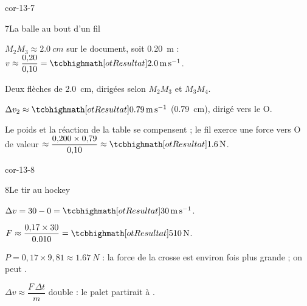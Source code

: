 \begin{blocLivre}{cor-13-7}
\begin{corrige}{7}{La balle au bout d'un fil}
\begin{questions}
\item $M_2M_3\approx\qty{2,0}{cm}$ sur le document, soit \qty{0,20}{m} : $v\approx\dfrac{0{,}20}{0{,}10}=\res{\qty{2,0}{m.s^{-1}}}$.
\item Deux flèches de \qty{2,0}{cm}, dirigées selon $M_2M_3$ et $M_3M_4$.
\item $\Delta v_2\approx\res{\qty{0,79}{m.s^{-1}}}$ (\qty{0,79}{cm}), dirigé vers le  O.
\item Le poids et la réaction de la table se compensent ; le fil exerce une force vers O de valeur $\approx\dfrac{0{,}200\times0{,}79}{0{,}10}\approx\res{\qty{1,6}{N}}$.
\end{questions}
\end{corrige}
\end{blocLivre}
\begin{blocLivre}{cor-13-8}
\begin{corrige}{8}{Le tir au hockey}
\begin{questions}
\item $\Delta v=30-0=\res{\qty{30}{m.s^{-1}}}$.
\item $F\approx\dfrac{0{,}17\times30}{\num{0,010}}=\res{\qty{510}{N}}$.
\item $P=0{,}17\times9{,}81\approx\qty{1,67}{N}$ : la force de la crosse est environ  fois plus grande ; on peut .
\item $\Delta v\approx\dfrac{F\,\Delta t}{m}$ double : le palet partirait à .
\end{questions}
\end{corrige}
\end{blocLivre}
